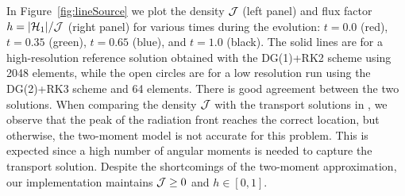 \documentclass[10pt,preprint]{aastex}
\begin{document}
In Figure~\ref{fig:lineSource} we plot the density $\mathcal{J}$ (left panel) and flux factor $h=|\mathcal{H}_{1}|/\mathcal{J}$ (right panel) for various times during the evolution: $t=0.0$ (red), $t=0.35$ (green), $t=0.65$ (blue), and $t=1.0$ (black).  
The solid lines are for a high-resolution reference solution obtained with the DG(1)+RK2 scheme using 2048 elements, while the open circles are for a low resolution run using the DG(2)+RK3 scheme and 64 elements.  
There is good agreement between the two solutions.  
When comparing the density $\mathcal{J}$ with the transport solutions in \citet{garrettHauck_2013}, we observe that the peak of the radiation front reaches the correct location, but otherwise, the two-moment model is not accurate for this problem.  
This is expected since a high number of angular moments is needed to capture the transport solution.  
Despite the shortcomings of the two-moment approximation, our implementation maintains $\mathcal{J}\ge0$ and $h\in[0,1]$.  
\end{document}
